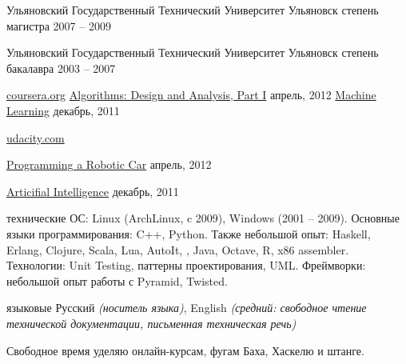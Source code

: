 \documentclass[unicode, 10pt, a4paper, oneside, fleqn]{article}
\begin{document}
\spacedhrule{0.5em}{-0.4em}

\headedsection
  {Ульяновский Государственный Технический Университет}
  {Ульяновск} {
  \headedsubsection
    {степень магистра}
    {2007 -- 2009} {
    }
  }

\headedsection
  {Ульяновский Государственный Технический Университет}
  {Ульяновск} {
  \headedsubsection
    {степень бакалавра}
    {2003 -- 2007} {
    }
  }

\spacedhrule{0.5em}{-0.4em}

\headedsection
  {\href{http://www.coursera.org}{coursera.org}}
  {} {
  \headedsubsection
    {\href{https://docs.google.com/document/d/1wD_QEJ7mdzxbR_PMVEbZ_tZ0SyakJ_8Y1gBAj_S5Ufg/edit}
          {Algorithms: Design and Analysis, Part I}}
    {апрель, 2012} {}
  \headedsubsection
    {\href{https://docs.google.com/document/d/11OT8thqIgBiwM80D_HjpiGtKTz5CnxiITPG_H6QbuUA/edit}
          {Machine Learning}}
    {декабрь, 2011} {}
  }

\headedsection
  {\href{http://udacity.com}{udacity.com}}
  {} {
  \headedsubsection
    {\href{https://docs.google.com/document/d/1LpUyUwh_gGyPyKf-oxTDOy8ncQejwog1jhgMmtf59mY/edit}
          {Programming a Robotic Car}}
    {апрель, 2012} {}

  \headedsubsection
    {\href{https://docs.google.com/document/d/1wD_QEJ7mdzxbR_PMVEbZ_tZ0SyakJ_8Y1gBAj_S5Ufg/edit}
          {Articifial Intelligence}}
    {декабрь, 2011} {}
  }

\spacedhrule{0.5em}{-0.4em}


\inlineheadsection  %
  {технические}
  {ОС: Linux (ArchLinux, c 2009), Windows (2001 -- 2009).
   Основные языки программирования: C++, Python.
   Также небольшой опыт: Haskell, Erlang, Clojure, Scala, Lua, AutoIt, \CS,
   Java, Octave, R, x86 assembler.
   Технологии: Unit Testing, паттерны проектирования, UML.
   Фреймворки: небольшой опыт работы с Pyramid, Twisted.
  }

\inlineheadsection
  {языковые}
  {Русский \emph{(носитель языка)}, English \emph{(средний: свободное чтение
   технической документации, письменная техническая речь)}}

\spacedhrule{1.6em}{-0.4em}


\inlineheadsection
  {}
  {Свободное время уделяю онлайн-курсам, фугам Баха, Хаскелю и штанге.}
\end{document}
